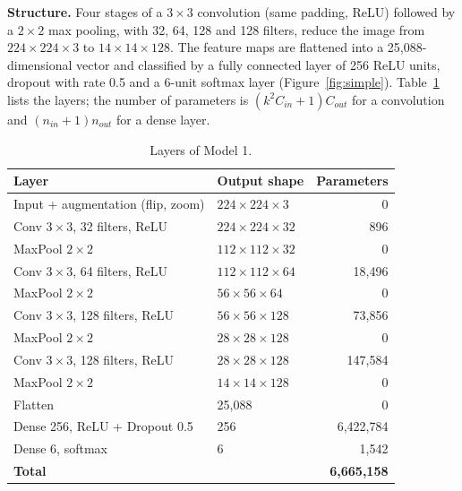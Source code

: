 \documentclass[12pt,letterpaper]{article}
\begin{document}
\textbf{Structure.} Four stages of a $3\times3$ convolution (same padding, ReLU) followed by a $2\times2$ max pooling,
with 32, 64, 128 and 128 filters, reduce the image from $224\times224\times3$ to $14\times14\times128$. The feature
maps are flattened into a 25{,}088-dimensional vector and classified by a fully connected layer of 256 ReLU units,
dropout with rate 0.5 and a 6-unit softmax layer (Figure~\ref{fig:simple}). Table~\ref{tab:simple} lists the layers;
the number of parameters is $(k^2C_{in}+1)C_{out}$ for a convolution and $(n_{in}+1)n_{out}$ for a dense layer.

\begin{table}[htbp]
\centering\small
\caption{Layers of Model 1.}
\label{tab:simple}
\begin{tabular}{llr}
\toprule
Layer & Output shape & Parameters \\
\midrule
Input + augmentation (flip, zoom)      & $224\times224\times3$  & 0 \\
Conv $3\times3$, 32 filters, ReLU      & $224\times224\times32$ & 896 \\
MaxPool $2\times2$                     & $112\times112\times32$ & 0 \\
Conv $3\times3$, 64 filters, ReLU      & $112\times112\times64$ & 18{,}496 \\
MaxPool $2\times2$                     & $56\times56\times64$   & 0 \\
Conv $3\times3$, 128 filters, ReLU     & $56\times56\times128$  & 73{,}856 \\
MaxPool $2\times2$                     & $28\times28\times128$  & 0 \\
Conv $3\times3$, 128 filters, ReLU     & $28\times28\times128$  & 147{,}584 \\
MaxPool $2\times2$                     & $14\times14\times128$  & 0 \\
Flatten                                & 25{,}088               & 0 \\
Dense 256, ReLU + Dropout 0.5          & 256                    & 6{,}422{,}784 \\
Dense 6, softmax                       & 6                      & 1{,}542 \\
\midrule
\textbf{Total}                         &                        & \textbf{6{,}665{,}158} \\
\bottomrule
\end{tabular}
\end{table}
\end{document}
